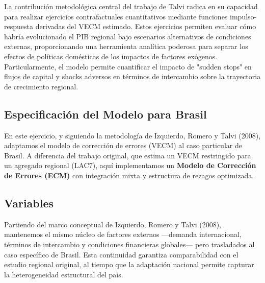 \documentclass[3p,11pt]{elsarticle}
\begin{document}
La contribución metodológica central del trabajo de Talvi radica en su capacidad para realizar ejercicios contrafactuales cuantitativos mediante funciones impulso-respuesta derivadas del VECM estimado. Estos ejercicios permiten evaluar cómo habría evolucionado el PIB regional bajo escenarios alternativos de condiciones externas, proporcionando una herramienta analítica poderosa para separar los efectos de políticas domésticas de los impactos de factores exógenos. Particularmente, el modelo permite cuantificar el impacto de "sudden stops" en flujos de capital y shocks adversos en términos de intercambio sobre la trayectoria de crecimiento regional.

\subsection{Especificación del Modelo para Brasil}

En este ejercicio, y siguiendo la metodología de Izquierdo, Romero y Talvi (2008), adaptamos el modelo de corrección de errores
(VECM) al caso particular de Brasil. A diferencia del trabajo original, que estima un VECM restringido para
un agregado regional (LAC7), aquí implementamos un \textbf{Modelo de Corrección de Errores (ECM)} con
integración mixta y estructura de rezagos optimizada.

\subsection{Variables}

Partiendo del marco conceptual de Izquierdo, Romero y Talvi (2008), mantenemos el mismo núcleo de factores externos —demanda internacional, términos de intercambio y condiciones financieras globales— pero trasladados al caso específico de Brasil. Esta continuidad garantiza comparabilidad con el estudio regional original, al tiempo que la adaptación nacional permite capturar la heterogeneidad estructural del país.
\end{document}
